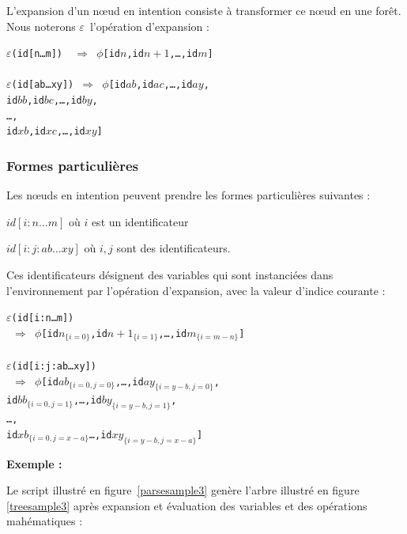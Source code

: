\documentclass{article}
\newcommand{\exemple}	{\vspace*{1mm}\hspace*{-4mm}\textbf{Exemple :}}
\newcommand{\code}	[2][0.9]		{\vspace{0mm}\begin{center}\colorbox{mygrey}{
							\begin{minipage}[t]{#1\columnwidth} 
							{\small \texttt{#2}}
							\end{minipage}}\end{center}}
\newcommand{\foret}		{\ensuremath{\phi}}
\newcommand{\nexpand}	{\ensuremath{\varepsilon}}
\newcommand{\ulc}		{\hspace*{37mm}}
\newcommand{\uld}		{\hspace*{9mm}}
\begin{document}
L'expansion d'un nœud en intention consiste à transformer ce nœud en une forêt. Nous noterons \nexpand\ l'opération d'expansion :
\code{\nexpand(id[n…m]) \ $\Rightarrow$ \foret [id$n$,id$n+1$,…,id$m$]\\
\\
\nexpand(id[ab…xy]) $\Rightarrow$ \foret [id$ab$,id$ac$,…,id$ay$,\\
\ulc id$bb$,id$bc$,…,id$by$,\\
\ulc …,\\
\ulc id$xb$,id$xc$,…,id$xy$]
}

\subsubsection{Formes particulières}

Les nœuds en intention peuvent prendre les formes particulières suivantes : 
\begin{description}
\item $id[i:n…m]$ 	où $i$ est un identificateur
\item $id[i:j:ab…xy]$ où $i,j$ sont des identificateurs.
\end{description}
Ces identificateurs désignent des variables qui sont instanciées dans l'environnement par l'opération d'expansion, avec la valeur d'indice courante :
\code{\nexpand(id[i:n…m]) \\
\ $\Rightarrow$ \foret [id$n_{\{i=0\}}$,id$n+1_{\{i=1\}}$,…,id$m_{\{i=m-n\}}$]\\
\\
\nexpand(id[i:j:ab…xy]) \\
\ $\Rightarrow$ \foret [id$ab_{\{i=0,j=0\}}$,…,id$ay_{\{i=y-b,j=0\}}$,\\
\uld id$bb_{\{i=0,j=1\}}$,…,id$by_{\{i=y-b,j=1\}}$,\\
\uld …,\\
\uld id$xb_{\{i=0,j=x-a\}}$…,id$xy_{\{i=y-b,j=x-a\}}$]
}

\exemple

Le script illustré en figure~\ref{parsesample3} genère l'arbre illustré en figure \ref{treesample3} après expansion et évaluation des variables et des opérations mahématiques :
\end{document}
